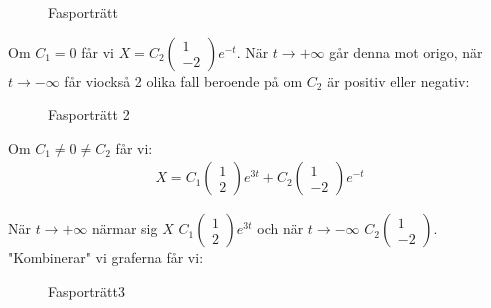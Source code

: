 \begin{figure}[ht]
    \centering
    \caption{Fasporträtt}
    \label{fig:fasporträtt}
\end{figure}
\par\bigskip
\noindent Om $C_1 = 0$ får vi $X = C_2\begin{pmatrix}1\\-2\end{pmatrix}e^{-t}$. När $t\to+\infty$ går denna mot origo, när $t\to-\infty$ får viockså 2 olika fall beroende på om $C_2$ är positiv eller negativ:

\begin{figure}[ht]
    \centering
    \caption{Fasporträtt 2}
    \label{fig:fasporträtt-2}
\end{figure}
\par\bigskip
\noindent Om $C_1\neq0\neq C_2$ får vi:
\begin{equation*}
  \begin{gathered}
    X = C_1\begin{pmatrix}1\\2\end{pmatrix}e^{3t}+C_2\begin{pmatrix}1\\-2\end{pmatrix}e^{-t}
  \end{gathered}
\end{equation*}
\par\bigskip
\noindent När $t\to+\infty$ närmar sig $X$ $C_1\begin{pmatrix}1\\2\end{pmatrix}e^{3t}$ och när $t\to-\infty$ $C_2\begin{pmatrix}1\\-2\end{pmatrix}$. "Kombinerar" vi graferna får vi:

\begin{figure}[ht]
    \centering
    \caption{Fasporträtt3}
    \label{fig:fasporträtt3}
\end{figure}
